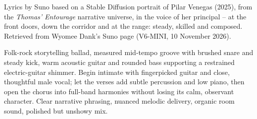 
\label{sec:steady-as-the-line}
\begin{notes}
Lyrics by Suno based on a Stable Diffusion portrait of Pilar Venegas (2025), from the \emph{Thomas' Entourage} narrative universe, in the voice of her principal -- at the front doors, down the corridor and at the range: steady, skilled and composed. Retrieved from Wyomee Dank's Suno page (V6-MINI, 10 November 2026).
\end{notes}
\begin{style}
Folk-rock storytelling ballad, measured mid-tempo groove with brushed snare and steady kick, warm acoustic guitar and rounded bass supporting a restrained electric-guitar shimmer. Begin intimate with fingerpicked guitar and close, thoughtful male vocal; let the verses add subtle percussion and low piano, then open the chorus into full-band harmonies without losing its calm, observant character. Clear narrative phrasing, nuanced melodic delivery, organic room sound, polished but unshowy mix.
\end{style}
